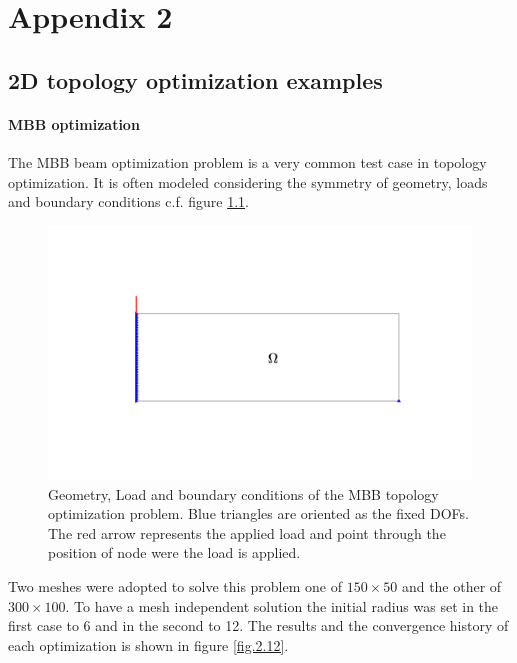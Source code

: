 \chapter{Appendix 2}
\section{2D topology optimization examples}
\label{examples_to2D}
\subsubsection{MBB optimization}
The MBB beam optimization problem is a very common test case in topology optimization. It is often modeled considering the symmetry of geometry, loads and boundary conditions c.f. figure \ref{fig.2.11}.
\begin{figure}[ht]
\centering
\includegraphics[width=\textwidth]{images/Ch2/design_problem}
\caption{Geometry, Load and boundary conditions of the MBB topology optimization problem. Blue triangles are oriented as the fixed DOFs. The red arrow represents the applied load and point through the position of node were the load is applied.}
\label{fig.2.11}
\end{figure}
Two meshes were adopted to solve this problem one of $150\times50$ and the other of $300\times100$. To have a mesh independent solution the initial radius was set in the first case to 6 and in the second to 12. The results and the convergence history of each optimization is shown in figure \ref{fig.2.12}. 
